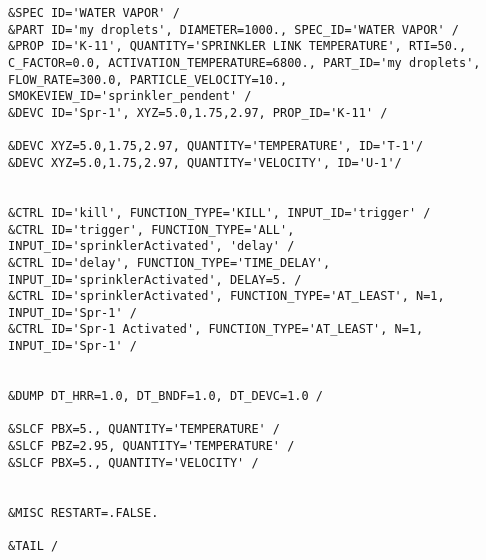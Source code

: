 \begin{lstlisting}[emptylines=0,basicstyle=\tiny]
&SPEC ID='WATER VAPOR' /
&PART ID='my droplets', DIAMETER=1000., SPEC_ID='WATER VAPOR' /
&PROP ID='K-11', QUANTITY='SPRINKLER LINK TEMPERATURE', RTI=50., C_FACTOR=0.0, ACTIVATION_TEMPERATURE=6800., PART_ID='my droplets', FLOW_RATE=300.0, PARTICLE_VELOCITY=10., SMOKEVIEW_ID='sprinkler_pendent' /
&DEVC ID='Spr-1', XYZ=5.0,1.75,2.97, PROP_ID='K-11' /

&DEVC XYZ=5.0,1.75,2.97, QUANTITY='TEMPERATURE', ID='T-1'/
&DEVC XYZ=5.0,1.75,2.97, QUANTITY='VELOCITY', ID='U-1'/


&CTRL ID='kill', FUNCTION_TYPE='KILL', INPUT_ID='trigger' /
&CTRL ID='trigger', FUNCTION_TYPE='ALL', INPUT_ID='sprinklerActivated', 'delay' /
&CTRL ID='delay', FUNCTION_TYPE='TIME_DELAY', INPUT_ID='sprinklerActivated', DELAY=5. /
&CTRL ID='sprinklerActivated', FUNCTION_TYPE='AT_LEAST', N=1, INPUT_ID='Spr-1' /
&CTRL ID='Spr-1 Activated', FUNCTION_TYPE='AT_LEAST', N=1, INPUT_ID='Spr-1' /


&DUMP DT_HRR=1.0, DT_BNDF=1.0, DT_DEVC=1.0 /

&SLCF PBX=5., QUANTITY='TEMPERATURE' /
&SLCF PBZ=2.95, QUANTITY='TEMPERATURE' /
&SLCF PBX=5., QUANTITY='VELOCITY' /


&MISC RESTART=.FALSE.

&TAIL /
\end{lstlisting}

